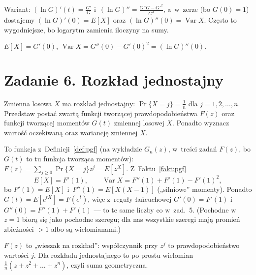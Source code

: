 \documentclass[11pt]{article}
\begin{document}
Wariant: $(\ln G)'(t)=\frac{G'}{G}$ i~$(\ln G)''=\frac{G''G-G'^2}{G^2}$,
a~w~zerze (bo $G(0)=1$) dostajemy $(\ln G)'(0)=E[X]$ oraz
$(\ln G)''(0)=\operatorname{Var}X$. Często to wygodniejsze, bo logarytm
zamienia iloczyny na sumy.
\begin{odpowiedz}
$E[X]=G'(0)$, \quad $\operatorname{Var}X=G''(0)-G'(0)^2=(\ln G)''(0)$.
\end{odpowiedz}

\section{Zadanie 6. Rozkład jednostajny}
\begin{tresc}
Zmienna losowa $X$ ma rozkład jednostajny: $\Pr\{X=j\}=\frac1n$ dla
$j=1,2,\ldots,n$. Przedstaw postać zwartą funkcji tworzącej
prawdopodobieństwa $F(z)$ oraz funkcji tworzącej momentów $G(t)$ zmiennej
losowej $X$. Ponadto wyznacz wartość oczekiwaną oraz wariancję zmiennej $X$.
\end{tresc}

\begin{teoria}\label{teoria:pgf}
To funkcja z~Definicji~\ref{def:pgf} (na wykładzie $G_n(z)$, w~treści
zadań $F(z)$, bo $G(t)$ to tu funkcja tworząca momentów):
$F(z)=\sum_{j\ge0}\Pr\{X=j\}z^j=E[z^X]$. Z~Faktu~\ref{fakt:pgf}
\[
E[X]=F'(1),\qquad
\operatorname{Var}X=F''(1)+F'(1)-F'(1)^2,
\]
bo $F'(1)=E[X]$ i~$F''(1)=E[X(X-1)]$ („silniowe” momenty).
Ponadto $G(t)=E[e^{tX}]=F(e^t)$, więc z~reguły łańcuchowej
$G'(0)=F'(1)$ i~$G''(0)=F''(1)+F'(1)$ --- to
te same liczby co w~zad.~5. (Pochodne w~$z=1$ biorą się jako pochodne
szeregu; dla nas wszystkie szeregi mają promień zbieżności $>1$ albo są
wielomianami.)
\end{teoria}

\begin{intuicja}
$F(z)$ to „wieszak na rozkład”: współczynnik przy $z^j$ to
prawdopodobieństwo wartości $j$. Dla rozkładu jednostajnego to po prostu
wielomian $\frac1n(z+z^2+\dots+z^n)$, czyli suma geometryczna.
\end{intuicja}
\end{document}

